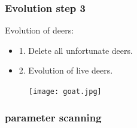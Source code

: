 \documentclass{beamer}
\begin{document}
\frame
{
  \frametitle{Evolution step 3}
  Evolution of deers: \\
  \begin{itemize}
  \item 1. Delete all unfortunate deers. \\
  \pause
  \item 2. Evolution of live deers. \\
  \end{itemize}
  \begin{figure}[htbp]
  \begin{center}
  \texttt{[image: goat.jpg]}
  \label{default}
  \end{center}
  \end{figure}
}
\frame
{
  \frametitle{parameter scanning}
  
}
\end{document}

